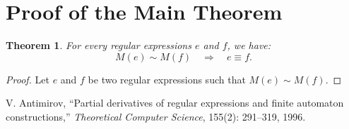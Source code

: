 \documentclass{article}
\newtheorem{theorem}[definition]{Theorem}
\begin{document}
\section{Proof of the Main Theorem}
\begin{theorem} For every regular expressions $e$ and $f$, we have:
     $$M(e)\sim M(f) \quad \Longrightarrow \quad e \equiv f.$$
\end{theorem}
\begin{proof}
    Let $e$ and $f$ be two regular expressions such that $M(e)\sim M(f)$. 

\end{proof}
    \begin{thebibliography}{9}
V. Antimirov, ``Partial derivatives of regular expressions and finite automaton constructions,'' \emph{Theoretical Computer Science}, 155(2): 291--319, 1996.
\end{thebibliography}
\end{document}
